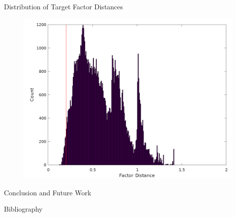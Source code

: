\documentclass[handout]{beamer}
\begin{document}
\begin{frame}{Distribution of Target Factor Distances}
  \begin{figure}
    \centering
    \includegraphics[height=0.6\textheight]{diagrams/conference-target-distance}
  \end{figure}
\end{frame}


\begin{frame}{Conclusion and Future Work}

\end{frame}

\begin{frame}[allowframebreaks]{Bibliography}
{}

\end{frame}
\end{document}
